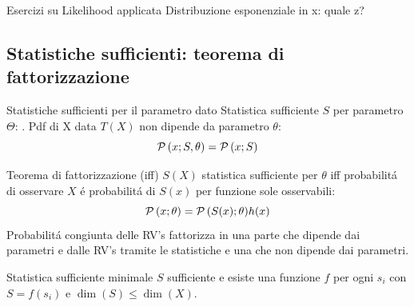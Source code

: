 \documentclass[asd-beamer.tex]{subfiles}
\begin{document}
\begin{frame}{Esercizi su Likelihood applicata}
Distribuzione esponenziale in x: quale z?
\end{frame}

\subsection{Statistiche sufficienti: teorema di fattorizzazione}

\begin{frame}{Statistiche sufficienti per il parametro dato}
Statistica sufficiente $S$ per parametro $\Theta$: . Pdf di X data $T(X)$ non dipende da parametro $\theta$:
\[\operatorname{\mathcal{P}}{(x;S,\theta)}=\operatorname{\mathcal{P}}{(x;S)}\]
\begin{block}{Teorema di fattorizzazione (iff)}
$S(X)$ statistica sufficiente per $\theta$ iff probabilit\'a di osservare $X$ \'e probabilit\'a di $S(x)$ per funzione sole osservabili: \[\operatorname{\mathcal{P}}{(x;\theta)}=\operatorname{\mathcal{P}}{(S(x);\theta)}h(x)\]
Probabilit\'a congiunta delle RV's fattorizza in una parte che dipende dai parametri e dalle RV's tramite le statistiche e una che non dipende dai parametri.
\end{block}
\begin{block}{Statistica sufficiente minimale}
$S$ sufficiente e esiste una funzione $f$ per ogni $s_i$ con $S=f(s_i)$ e $\dim({S})\leq\dim{(X)}$.
\end{block}
\end{frame}
\end{document}
